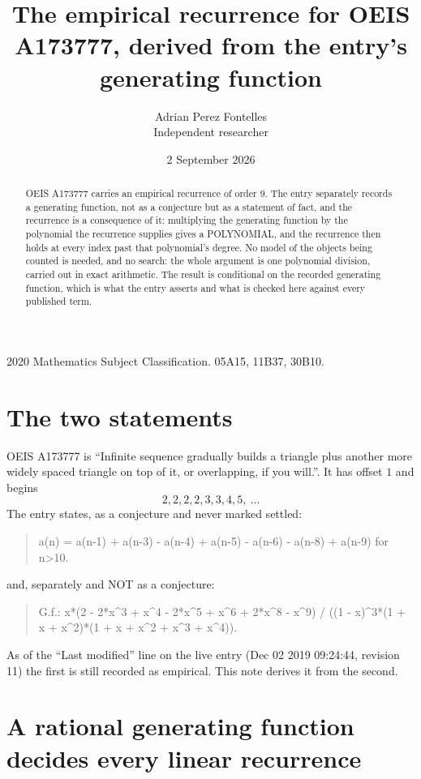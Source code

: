 \documentclass[11pt,a4paper]{article}
\title{The empirical recurrence for OEIS A173777, derived from the entry's generating function}
\author{Adrian Perez Fontelles\\ \small Independent researcher}
\date{2 September 2026}
\theoremstyle{plain}
\theoremstyle{definition}
\begin{document}
\maketitle

\begin{abstract}
OEIS A173777 carries an empirical recurrence of order $9$. The entry separately records a
generating function, not as a conjecture but as a statement of fact, and the recurrence is a
consequence of it: multiplying the generating function by the polynomial the recurrence
supplies gives a POLYNOMIAL, and the recurrence then holds at every index past that
polynomial's degree. No model of the objects being counted is needed, and no search: the
whole argument is one polynomial division, carried out in exact arithmetic. The result is
conditional on the recorded generating function, which is what the entry asserts and what is
checked here against every published term.
\end{abstract}

\noindent\small 2020 Mathematics Subject Classification. 05A15, 11B37, 30B10.\normalsize

\section{The two statements}

OEIS A173777 is ``Infinite sequence gradually builds a triangle plus another more widely spaced triangle on top of it, or overlapping, if you will.''. It has offset $1$ and begins
\[
2, 2, 2, 2, 3, 3, 4, 5,\ \dots
\]
The entry states, as a conjecture and never marked settled:
\begin{quote}
a(n) = a(n-1) + a(n-3) - a(n-4) + a(n-5) - a(n-6) - a(n-8) + a(n-9) for n>10.
\end{quote}
and, separately and NOT as a conjecture:
\begin{quote}
G.f.: x*(2 - 2*x\^{}3 + x\^{}4 - 2*x\^{}5 + x\^{}6 + 2*x\^{}8 - x\^{}9) / ((1 - x)\^{}3*(1 + x + x\^{}2)*(1 + x + x\^{}2 + x\^{}3 + x\^{}4)).
\end{quote}
As of the ``Last modified'' line on the live entry (Dec 02 2019 09:24:44, revision 11) the first is still
recorded as empirical. This note derives it from the second.

\section{A rational generating function decides every linear recurrence}
\end{document}
